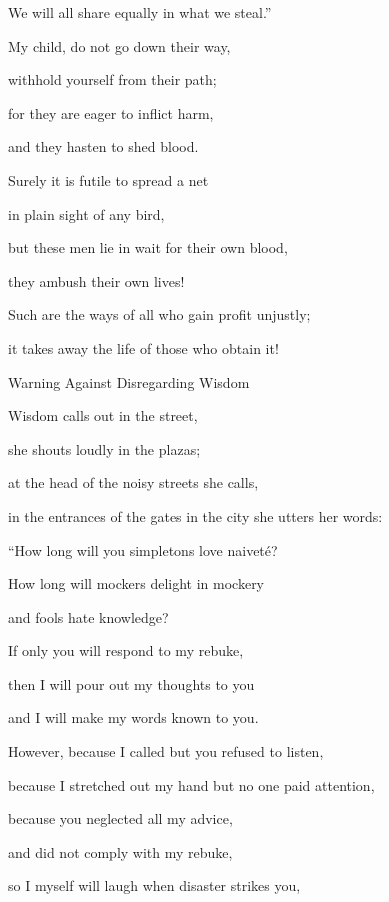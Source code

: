 {\par }{\Q We will all
share equally in what we steal.”
\par }{\Q {}My child,
do not
go
down their way,
\par }{\Q withhold
yourself
from their
path;
\par }{\Q {}for
they are eager
to inflict harm,
\par }{\Q and they
hasten
to shed
blood.
\par }{\Q {}Surely
it is futile
to spread
a net
\par }{\Q in plain
sight
of any
bird,
\par }{\Q {}but these
men lie in wait for their
own
blood,
\par }{\Q they ambush
their own lives!
\par }{\Q {}Such
are the ways
of all
who gain
profit unjustly;
\par }{\Q it takes
away
the life
of those who
obtain it!
\par }{\SH Warning Against Disregarding Wisdom
\par }{\Q {}Wisdom calls
out in the street,
\par }{\Q she shouts loudly
in the plazas;
\par }{\Q {}at the head
of the noisy
streets she calls,
\par }{\Q in the entrances
of the gates
in the city
she utters
her words:
\par }{\Q {}“How long
will you simpletons
love
naiveté?

\par }{\Q How long will mockers
delight
in mockery
\par }{\Q and fools
hate
knowledge?
\par }{\Q {}If only
you will respond
to my rebuke,
\par }{\Q then I
will pour out my thoughts
to you
\par }{\Q and I will make my
words
known to you.
\par }{\Q {}However, because
I called
but you refused
to listen,

\par }{\Q because I stretched
out my hand
but no
one paid attention,
\par }{\Q {}because you neglected
all
my advice,
\par }{\Q and did not
comply
with my rebuke,
\par }{\Q {}so I myself
will laugh
when disaster
strikes you,

}
